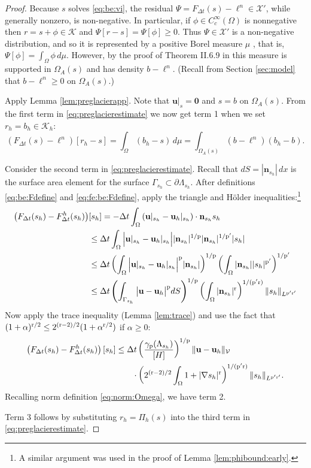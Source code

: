 \documentclass[hidelinks,onefignum,onetabnum,final]{siamart220329}  %
\newcommand{\grad}{\nabla}
\newcommand{\bn}{\mathbf{n}}
\newcommand{\bu}{\mathbf{u}}
\newcommand{\bzero}{\bm{0}}
\newcommand{\cK}{\mathcal{K}}
\newcommand{\cV}{\mathcal{V}}
\newcommand{\cX}{\mathcal{X}}
\newcommand{\pp}{{\text{\textnormal{p}}}}
\newcommand{\rr}{{\text{\textnormal{r}}}}
\begin{document}
\begin{proof}  Because $s$ solves \eqref{eq:be:vi}, the residual $\Psi = F_{\Delta t}(s)-\ell^n \in \cX'$, while generally nonzero, is non-negative.  In particular, if $\phi\in C_c^\infty(\Omega)$ is nonnegative then $r=s+\phi \in \cK$ and $\Psi[r-s] = \Psi[\phi] \ge 0$.  Thus $\Psi\in\cX'$ is a non-negative distribution, and so it is represented by a positive Borel measure $\mu$ \cite[Theorem 6.22]{LiebLoss1997}, that is, $\Psi[\phi] = \int_\Omega \phi\,d\mu$.  However, by the proof of Theorem II.6.9 in \cite{KinderlehrerStampacchia1980} this measure is supported in $\Omega_A(s)$ and has density $b-\ell^n$.  (Recall from Section \ref{sec:model} that $b-\ell^n\ge 0$ on $\Omega_A(s)$.)

Apply Lemma \ref{lem:preglacierapp}.  Note that $\bu|_{s}=\bzero$ and $s=b$ on $\Omega_A(s)$.  From the first term in \eqref{eq:preglacierestimate} we now get term 1 when we set $r_h = b_h \in \cK_h$:
\begin{equation}
\left(F_{\Delta t}(s)-\ell^n\right)[r_h-s] = \int_\Omega (b_h - s) \,d\mu = \int_{\Omega_A(s)} \left(b - \ell^n\right) (b_h - b).
\end{equation}

Consider the second term in \eqref{eq:preglacierestimate}.  Recall that $dS = |\bn_{s_h}|\,dx$ is the surface area element for the surface $\Gamma_{s_h} \subset \partial \Lambda_{s_h}$.  After definitions \eqref{eq:be:Fdefine} and \eqref{eq:fe:be:Fdefine}, apply the triangle and H\"older inequalities:\footnote{A similar argument was used in the proof of Lemma \ref{lem:phibound:early}.}
\begin{align}
\left(F_{\Delta t}(s_h)-F^h_{\Delta t}(s_h)\right)&[s_h] = - \Delta t \int_\Omega \left(\bu|_{s_h} - \bu_h|_{s_h}\right)\cdot \bn_{s_h} s_h  \\
  &\le \Delta t \int_\Omega \Big|\bu|_{s_h} - \bu_h|_{s_h}\Big| |\bn_{s_h}|^{1/\pp} |\bn_{s_h}|^{1/\pp'} |s_h| \notag \\
  &\le \Delta t \left(\int_\Omega \Big|\bu|_{s_h} - \bu_h|_{s_h}\Big|^\pp |\bn_{s_h}|\right)^{1/\pp} \left(\int_\Omega |\bn_{s_h}| |s_h|^{\pp'}\right)^{1/\pp'} \notag \\
  &\le \Delta t \left(\int_{\Gamma_{s_h}} \big|\bu - \bu_h\big|^\pp dS\right)^{1/\pp} \left(\int_\Omega |\bn_{s_h}|^\rr\right)^{1/(\pp'\rr)} \|s_h\|_{L^{\pp'\rr'}} \notag
\end{align}
Now apply the trace inequality (Lemma \ref{lem:trace}) and use the fact that $(1+\alpha)^{\rr/2} \le 2^{(\rr-2)/2} (1+\alpha^{\rr/2})$ if $\alpha\ge 0$:
\begin{align}
\left(F_{\Delta t}(s_h)-F^h_{\Delta t}(s_h)\right)[s_h] &\le \Delta t \left(\frac{\gamma_\pp(\Lambda_{s_h})}{[H]}\right)^{1/\pp} \|\bu - \bu_h\|_{\cV} \\
  &\qquad \cdot \left(2^{(\rr-2)/2} \int_\Omega 1 + |\grad s_h|^\rr\right)^{1/(\pp'\rr)} \|s_h\|_{L^{\pp'\rr'}}.  \notag
\end{align}
Recalling norm definition \eqref{eq:norm:Omega}, we have term 2.

Term 3 follows by substituting $r_h=\Pi_h(s)$ into the third term in \eqref{eq:preglacierestimate}.
\end{proof}
\end{document}
